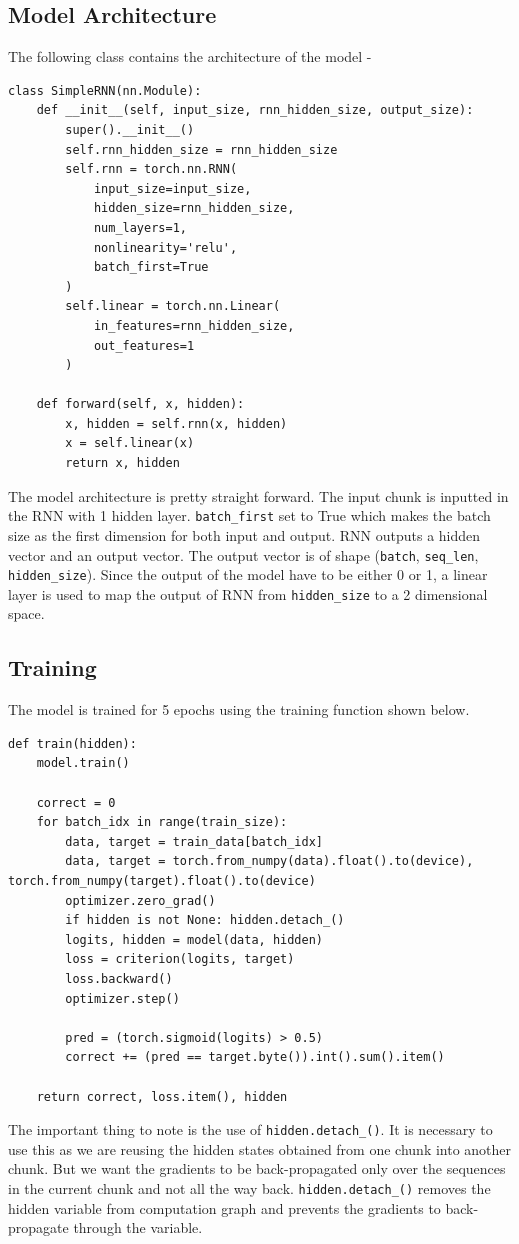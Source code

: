 \subsection{Model Architecture}
The following class contains the architecture of the model -
\begin{verbatim}
class SimpleRNN(nn.Module):
    def __init__(self, input_size, rnn_hidden_size, output_size):
        super().__init__()
        self.rnn_hidden_size = rnn_hidden_size
        self.rnn = torch.nn.RNN(
            input_size=input_size,
            hidden_size=rnn_hidden_size,
            num_layers=1,
            nonlinearity='relu',
            batch_first=True
        )
        self.linear = torch.nn.Linear(
            in_features=rnn_hidden_size,
            out_features=1
        )

    def forward(self, x, hidden):
        x, hidden = self.rnn(x, hidden)  
        x = self.linear(x)
        return x, hidden
\end{verbatim}
The model architecture is pretty straight forward. 
The input chunk is inputted in the RNN with 1 hidden layer. 
\texttt{batch\_first} set to True which makes the batch size as the first dimension for both input and output. 
RNN outputs a hidden vector and an output vector. The output vector is of shape (\texttt{batch}, \texttt{seq\_len}, \texttt{hidden\_size}). 
Since the output of the model have to be either 0 or 1, a linear layer is used to map the output of RNN from \texttt{hidden\_size} to a 2 dimensional space.

\subsection{Training}
The model is trained for 5 epochs using the training function shown below.
\begin{verbatim}
def train(hidden):
    model.train()
       
    correct = 0
    for batch_idx in range(train_size):
        data, target = train_data[batch_idx]
        data, target = torch.from_numpy(data).float().to(device), torch.from_numpy(target).float().to(device)
        optimizer.zero_grad()
        if hidden is not None: hidden.detach_()
        logits, hidden = model(data, hidden)
        loss = criterion(logits, target)
        loss.backward()
        optimizer.step()
        
        pred = (torch.sigmoid(logits) > 0.5)
        correct += (pred == target.byte()).int().sum().item()
        
    return correct, loss.item(), hidden
\end{verbatim}
The important thing to note is the use of \texttt{hidden.detach\_()}.
It is necessary to use this as we are reusing the hidden states obtained from one chunk into another chunk. 
But we want the gradients to be back-propagated only over the sequences in the current chunk and not all the way back. \texttt{hidden.detach\_()} removes the hidden variable from computation graph and prevents the gradients to back-propagate through the variable.

